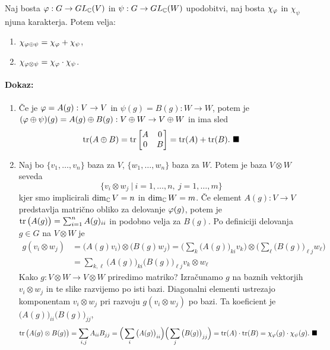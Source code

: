 \begin{trditev}
	Naj bosta $\varphi : G \to GL_{\mathbb{C}}(V)$ in $\psi : G \to GL_{\mathbb{C}}(W)$ upodobitvi, naj bosta $\chi_{\varphi}$ in $\chi_\psi$ njuna
	karakterja. Potem velja:
	\begin{enumerate}
		\item{$\chi_{\varphi \oplus \psi} = \chi_{\varphi} + \chi_\psi$,}
		\item{$\chi_{\varphi \otimes \psi} = \chi_{\varphi} \cdot \chi_\psi$.}
	\end{enumerate}
\end{trditev}

\paragraph{Dokaz:}
\begin{enumerate}
	\item{\v Ce je $\varphi = A(g) : V \to V$ in $\psi(g) = B(g) : W \to W$, potem je $(\varphi \oplus \psi)(g) = A(g) \oplus B(g)
		: V \oplus W \to V \oplus W$ in ima sled
		\[
			\tr (A \oplus B) = \tr\begin{bmatrix} A & 0 \\ 0 & B \end{bmatrix} = \tr(A) + \tr(B).\ \blacksquare
		\]}
	\item{Naj bo $\{v_1, \ldots, v_n\}$ baza za $V$, $\{w_1, \ldots, w_n\}$ baza za $W$. Potem je baza $V \otimes W$ seveda
		\[
			\{v_i \otimes w_j\ |\ i = 1, \ldots, n,\ j = 1, \ldots, m\}
		\]kjer smo implicirali $\dim_{\mathbb{C}} V = n$ in $\dim_{\mathbb{C}} W = m$. \v Ce element $A(g) : V \to V$ predstavlja matri\v cno
		obliko za delovanje $\varphi(g)$, potem je $\operatorname{tr}\big(A(g)\big) = \sum_{i = 1}^n A(g)_{ii}$ in podobno velja za
		$B(g)$. Po definiciji delovanja $g \in G$ na $V \otimes W$ je
		\begin{align*}
			g(v_i \otimes w_j) &= \big(A(g) v_i\big) \otimes \big(B(g) w_j\big) =
				\Big(\sum_{k} \big(A(g)\big)_{ki} v_k\Big) \otimes \Big(\sum_{\ell} \big(B(g)\big)_{\ell j}
				w_\ell\Big) \\
			&= \sum_{k,\ell} \big(A(g)\big)_{ki} \big(B(g)\big)_{\ell j} v_k \otimes w_{\ell}
		\end{align*}
		Kako $g : V \otimes W \to V \otimes W$ priredimo matriko? Izra\v cunamo $g$ na baznih vektorjih $v_i \otimes w_j$
		in te slike razvijemo po isti bazi. Diagonalni elementi ustrezajo komponentam $v_i \otimes w_j$ pri razvoju
		$g(v_i \otimes w_j)$ po bazi. Ta koeficient je $\big(A(g)\big)_{ii} \big(B(g)\big)_{jj}$,
		\[
			\operatorname{tr} \big(A(g) \otimes B(g)\big) = \sum_{i,j} A_{ii} B_{jj} = \Big(\sum_i \big(A(g)\big)_{ii}\Big)
				\Big(\sum_j \big(B(g)\big)_{jj}\Big)
				= \operatorname{tr}(A) \cdot \operatorname{tr}(B) = \chi_{\varphi}(g) \cdot \chi_{\psi}(g).\ \blacksquare
		\]}
\end{enumerate}

